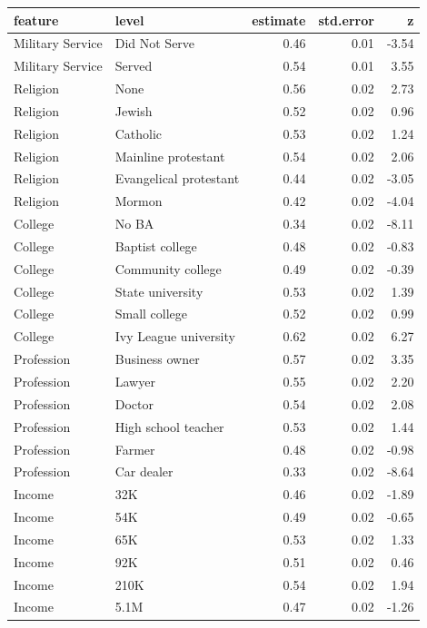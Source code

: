 \documentclass[a4paper,12pt]{article}\usepackage[]{graphicx}\usepackage[]{color}
\begin{document}
\begin{table}[ht]
\centering
\begingroup\footnotesize
\begin{tabular}{lp{3in}rrr}
  \hline
feature & level & estimate & std.error & z \\ 
  \hline
Military Service & Did Not Serve & 0.46 & 0.01 & -3.54 \\ 
  Military Service & Served & 0.54 & 0.01 & 3.55 \\ 
  Religion & None & 0.56 & 0.02 & 2.73 \\ 
  Religion & Jewish & 0.52 & 0.02 & 0.96 \\ 
  Religion & Catholic & 0.53 & 0.02 & 1.24 \\ 
  Religion & Mainline protestant & 0.54 & 0.02 & 2.06 \\ 
  Religion & Evangelical protestant & 0.44 & 0.02 & -3.05 \\ 
  Religion & Mormon & 0.42 & 0.02 & -4.04 \\ 
  College & No BA & 0.34 & 0.02 & -8.11 \\ 
  College & Baptist college & 0.48 & 0.02 & -0.83 \\ 
  College & Community college & 0.49 & 0.02 & -0.39 \\ 
  College & State university & 0.53 & 0.02 & 1.39 \\ 
  College & Small college & 0.52 & 0.02 & 0.99 \\ 
  College & Ivy League university & 0.62 & 0.02 & 6.27 \\ 
  Profession & Business owner & 0.57 & 0.02 & 3.35 \\ 
  Profession & Lawyer & 0.55 & 0.02 & 2.20 \\ 
  Profession & Doctor & 0.54 & 0.02 & 2.08 \\ 
  Profession & High school teacher & 0.53 & 0.02 & 1.44 \\ 
  Profession & Farmer & 0.48 & 0.02 & -0.98 \\ 
  Profession & Car dealer & 0.33 & 0.02 & -8.64 \\ 
  Income & 32K & 0.46 & 0.02 & -1.89 \\ 
  Income & 54K & 0.49 & 0.02 & -0.65 \\ 
  Income & 65K & 0.53 & 0.02 & 1.33 \\ 
  Income & 92K & 0.51 & 0.02 & 0.46 \\ 
  Income & 210K & 0.54 & 0.02 & 1.94 \\ 
  Income & 5.1M & 0.47 & 0.02 & -1.26 \\ 

\end{tabular}
\end{table}
\end{document}
